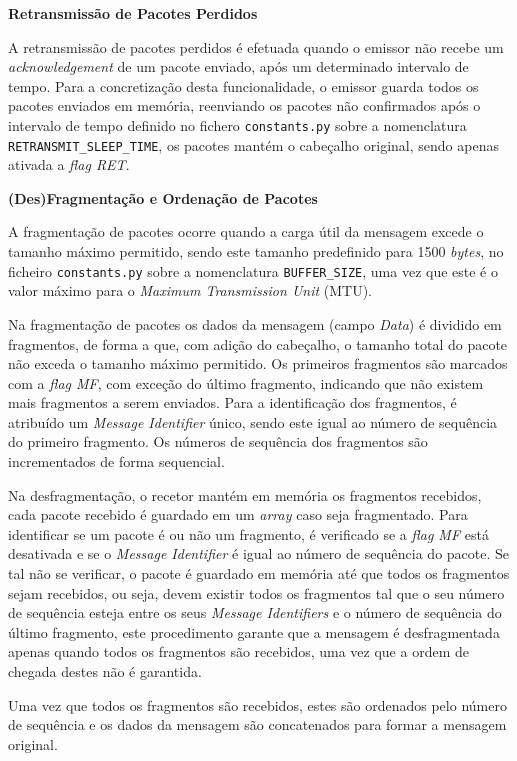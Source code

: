 \documentclass[a4paper,12pt]{scrreprt}
\begin{document}
\textbf{Retransmissão de Pacotes Perdidos}

A retransmissão de pacotes perdidos é efetuada quando o emissor não recebe um
\textit{acknowledgement} de um pacote enviado, após um determinado intervalo de
tempo. Para a concretização desta funcionalidade, o emissor guarda todos os pacotes
enviados em memória, reenviando os pacotes não confirmados após o intervalo de tempo
definido no fichero \texttt{constants.py} sobre a nomenclatura \texttt{RETRANSMIT\_SLEEP\_TIME},
os pacotes mantém o cabeçalho original, sendo apenas ativada a \textit{flag RET}.


\textbf{(Des)Fragmentação e Ordenação de Pacotes}

A fragmentação de pacotes ocorre quando a carga útil da mensagem excede o tamanho
máximo permitido, sendo este tamanho predefinido para 1500 \textit{bytes}, no
ficheiro \texttt{constants.py} sobre a nomenclatura \texttt{BUFFER\_SIZE},
uma vez que este é o valor máximo para o \textit{Maximum Transmission Unit} (MTU).

Na fragmentação de pacotes os dados da mensagem (campo \textit{Data}) é dividido em fragmentos,
de forma a que, com adição do cabeçalho, o tamanho total do pacote não exceda o tamanho
máximo permitido. Os primeiros fragmentos são marcados com a \textit{flag MF},
com exceção do último fragmento, indicando que não existem mais fragmentos a serem enviados.
Para a identificação dos fragmentos, é atribuído um \textit{Message Identifier} único, sendo
este igual ao número de sequência do primeiro fragmento. Os números de sequência dos fragmentos
são incrementados de forma sequencial.

Na desfragmentação, o recetor mantém em memória os fragmentos recebidos, cada pacote
recebido é guardado em um \textit{array} caso seja fragmentado. Para identificar
se um pacote é ou não um fragmento, é verificado se a \textit{flag MF} está desativada
e se o \textit{Message Identifier} é igual ao número de sequência do pacote. Se tal
não se verificar, o pacote é guardado em memória até que todos os fragmentos sejam
recebidos, ou seja, devem existir todos os fragmentos tal que o seu número de sequência
esteja entre os seus \textit{Message Identifiers} e o número de sequência do último fragmento,
este procedimento garante que a mensagem é desfragmentada apenas quando todos os
fragmentos são recebidos, uma vez que a ordem de chegada destes não é garantida.

Uma vez que todos os fragmentos são recebidos, estes são ordenados pelo número de
sequência e os dados da mensagem são concatenados para formar a mensagem original.
\end{document}
